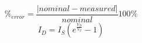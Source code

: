 \documentclass{article}
\begin{document}
\begin{equation}
  \label{eqn:percent_err}
  \%_{error} = \frac{|nominal - measured|}{nominal}100\%
\end{equation}
%
\begin{equation}
  \label{eqn:schlockley}
  I_D = I_S \left(e^{\frac{V_D}{V_T}} - 1\right)
\end{equation}
\end{document}
